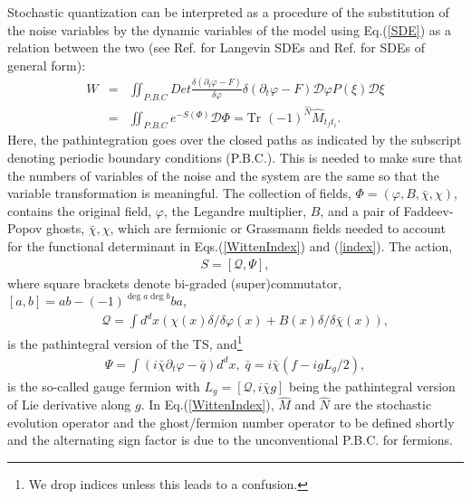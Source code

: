 \documentclass[final,5p,10pt,times,twocolumn,year]{elsarticle}
\begin{document}
Stochastic quantization \cite{ZinnJustin,ParSour,ParSour1,Baulieu_1988,Baulieu_1989} can be interpreted as a procedure of the substitution of the noise variables by the dynamic variables of the model using Eq.(\ref{SDE}) as a relation between the two (see Ref.\cite{TFT_BOOK} for Langevin SDEs and Ref.\cite{OvcEntropy} for SDEs of general form):
\begin{eqnarray}
    W &=& \iint_{P.B.C}Det \frac{\delta(\partial_t \varphi - F)}{\delta \varphi} \delta(\partial_t \varphi - F) \mathcal{D}\varphi P(\xi) \mathcal{D}\xi \nonumber \\
    &=& \iint_{P.B.C} e^{-S(\Phi)} \mathcal{D}\Phi = \text{Tr } (-1)^{\hat N} \hat M_{t_ft_i}.\label{WittenIndex}
\end{eqnarray}
Here, the pathintegration goes over the closed paths as indicated by the subscript denoting periodic boundary conditions (P.B.C.). This is needed to make sure that the numbers of variables  of the noise and the system are the same so that the variable transformation is meaningful. The collection of fields, $\Phi=(\varphi,B,\bar\chi,\chi)$, contains the original field, $\varphi$, the Legandre multiplier, $B$, and a pair of Faddeev-Popov ghosts, $\bar\chi,\chi$, which are fermionic or Grassmann fields needed to account for the functional determinant in Eqs.(\ref{WittenIndex}) and (\ref{index}). The action,
\begin{eqnarray}
S = [\mathcal{Q}, \Psi], \label{Action_0}
\end{eqnarray}
where square brackets denote bi-graded (super)commutator, $[ a,b] = a b - (-1)^{\deg a \deg b} ba$, 
\begin{eqnarray}
    &&\mathcal{Q}= \int d^{d}x \left(\chi(x) \delta/{\delta \varphi(x)} + B(x) \delta/{\delta \bar\chi(x)}\right), \label{Eq_q}
\end{eqnarray}
is the pathintegral version of the TS, and\footnote{We drop indices unless this leads to a confusion.}
\begin{eqnarray}
    \Psi = \int  ( i\bar\chi \partial_t \varphi - \bar q ) d^{d}x,\; \bar q = i\bar\chi \left( f - i g L_{g}/2 \right), \label{barQ}
\end{eqnarray}
is the so-called gauge fermion with $L_{g} = [\mathcal{Q},i\bar\chi g]$ being the pathintegral version of Lie derivative along $g$. In Eq.(\ref{WittenIndex}), $\hat M$ and $\hat N$ are the stochastic evolution operator and the ghost/fermion number operator to be defined shortly and the alternating sign factor is due to the unconventional P.B.C. for fermions.
\end{document}
